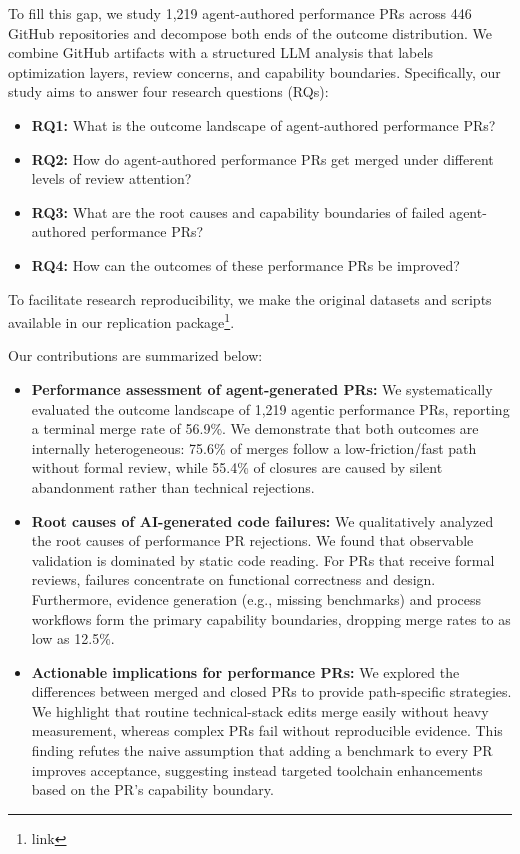 To fill this gap, we study 1,219 agent-authored performance PRs across 446 GitHub repositories and decompose both ends of the outcome distribution. We combine GitHub artifacts with a structured LLM analysis that labels optimization layers, review concerns, and capability boundaries. Specifically, our study aims to answer four research questions (RQs):
\begin{itemize}
    \item \textbf{RQ1:} What is the outcome landscape of agent-authored performance PRs?
    \item \textbf{RQ2:} How do agent-authored performance PRs get merged under different levels of review attention?
    \item \textbf{RQ3:} What are the root causes and capability boundaries of failed agent-authored performance PRs?
    \item \textbf{RQ4:} How can the outcomes of these performance PRs be improved?
\end{itemize}

To facilitate research reproducibility, we make the original datasets and scripts available in our replication package\footnote{link}. 

Our contributions are summarized below:
\begin{itemize}
    \item \textbf{Performance assessment of agent-generated PRs:} We systematically evaluated the outcome landscape of 1,219 agentic performance PRs, reporting a terminal merge rate of 56.9\%. We demonstrate that both outcomes are internally heterogeneous: 75.6\% of merges follow a low-friction/fast path without formal review, while 55.4\% of closures are caused by silent abandonment rather than technical rejections.
    \item \textbf{Root causes of AI-generated code failures:} We qualitatively analyzed the root causes of performance PR rejections. We found that observable validation is dominated by static code reading. For PRs that receive formal reviews, failures concentrate on functional correctness and design. Furthermore, evidence generation (e.g., missing benchmarks) and process workflows form the primary capability boundaries, dropping merge rates to as low as 12.5\%.
    \item \textbf{Actionable implications for performance PRs:} We explored the differences between merged and closed PRs to provide path-specific strategies. We highlight that routine technical-stack edits merge easily without heavy measurement, whereas complex PRs fail without reproducible evidence. This finding refutes the naive assumption that adding a benchmark to every PR improves acceptance, suggesting instead targeted toolchain enhancements based on the PR's capability boundary.
\end{itemize}

